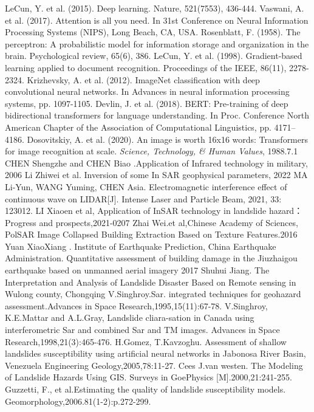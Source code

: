 \documentclass[conference]{IEEEtran}
\begin{document}
\begin{thebibliography}{00}
 LeCun, Y. et al. (2015). Deep learning. Nature, 521(7553), 436-444.
 Vaswani, A. et al. (2017). Attention is all you need. In 31st Conference on Neural Information Processing Systems (NIPS), Long Beach, CA, USA.
 Rosenblatt, F. (1958). The perceptron: A probabilistic model for information storage and organization in the brain. Psychological review, 65(6), 386.
 LeCun, Y. et al. (1998). Gradient-based learning applied to document recognition. Proceedings of the IEEE, 86(11), 2278-2324.
 Krizhevsky, A. et al. (2012). ImageNet classification with deep convolutional neural networks. In Advances in neural information processing systems, pp. 1097-1105.
 Devlin, J. et al. (2018). BERT: Pre-training of deep bidirectional transformers for language understanding. In Proc. Conference North American Chapter of the Association of Computational Linguistics, pp. 4171–4186.
 Dosovitskiy, A. et al. (2020). An image is worth 16x16 words: Transformers for image recognition at scale. 
 \textit{Science, Technology, \& Human Values}, 1988.7.1
 CHEN Shengzhe and CHEN Biao .Application of Infrared technology in military, 2006
 Li Zhiwei et al. Inversion of some In SAR geophysical parameters, 2022
 MA Li-Yun, WANG Yuming, CHEN Asia. Electromagnetic interference effect of continuous wave on LIDAR[J]. Intense Laser and Particle Beam, 2021, 33: 123012.
 LI Xiaoen et al, Application of InSAR technology in landslide hazard： Progress and prospects,2021-0207
 Zhai Wei.et al,Chinese Academy of Sciences, PolSAR Image Collapsed Building Extraction Based on Texture Features.2016
 Yuan XiaoXiang . Institute of Earthquake Prediction, China Earthquake Administration. Quantitative assessment of building damage in the Jiuzhaigou earthquake based on unmanned aerial imagery 2017
 Shuhui Jiang. The Interpretation and Analysis of Landslide Disaster Based on Remote sensing in  Wulong county, Chongqing
 V.Singhroy.Sar. integrated techniques for geohazard assessment.Advances in Space Research,1995,15(11):67-78.
 V.Singhroy, K.E.Mattar and A.L.Gray, Landslide cliara-sation in Canada using interferometric Sar and combined Sar and TM images.  Advances in Space Research,1998,21(3):465-476.
 H.Gomez, T.Kavzoghu. Assessment of shallow landslides susceptibility using artificial neural networks in Jabonosa River Basin, Venezuela Engineering Geology,2005,78:11-27.
 Cees J.van westen. The Modeling of Landslide Hazards Using GIS. Surveys in GoePhysics [M].2000,21:241-255.
 Guzzetti, F., et al.Estimating the quality of landslide susceptibility models. Geomorphology,2006.81(1-2):p.272-299.

\end{thebibliography}
\end{document}

